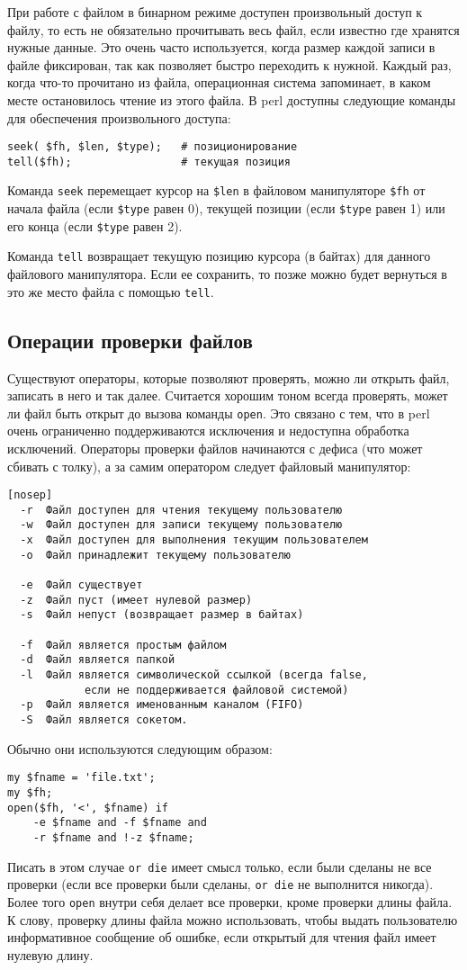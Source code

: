 При работе с файлом в бинарном режиме доступен произвольный доступ к файлу, то есть не обязательно прочитывать весь файл, если известно где хранятся нужные данные. Это очень часто используется, когда размер каждой записи в файле фиксирован, так как позволяет быстро переходить к нужной. Каждый раз, когда что-то прочитано из файла, операционная система запоминает, в каком месте остановилось чтение из этого файла. В perl доступны следующие команды для обеспечения произвольного доступа:
\begin{verbatim}
seek( $fh, $len, $type);   # позиционирование
tell($fh);                 # текущая позиция
\end{verbatim}
Команда \verb|seek| перемещает курсор на \verb|$len| в файловом манипуляторе \verb|$fh| от начала файла (если \verb|$type| равен 0), текущей позиции (если \verb|$type| равен 1) или его конца (если \verb|$type| равен 2).

Команда \verb|tell| возвращает текущую позицию курсора (в байтах) для данного файлового манипулятора. Если ее сохранить, то позже можно будет вернуться в это же место файла с помощью \verb|tell|.

\subsection{Операции проверки файлов}
Существуют операторы, которые позволяют проверять, можно ли открыть файл, записать в него и так далее. Считается хорошим тоном всегда проверять, может ли файл быть открыт до вызова команды \verb|open|. Это связано с тем, что в perl очень ограниченно поддерживаются исключения и недоступна обработка исключений. Операторы проверки файлов начинаются с дефиса (что может сбивать с толку), а за самим оператором следует файловый манипулятор:
\begin{verbatim}[nosep]
  -r  Файл доступен для чтения текущему пользователю
  -w  Файл доступен для записи текущему пользователю
  -x  Файл доступен для выполнения текущим пользователем
  -o  Файл принадлежит текущему пользователю

  -e  Файл существует
  -z  Файл пуст (имеет нулевой размер)
  -s  Файл непуст (возвращает размер в байтах)

  -f  Файл является простым файлом
  -d  Файл является папкой
  -l  Файл является символической ссылкой (всегда false,
            если не поддерживается файловой системой)
  -p  Файл является именованным каналом (FIFO)
  -S  Файл является сокетом.
\end{verbatim}
Обычно они используются следующим образом:
\begin{verbatim}
my $fname = 'file.txt';
my $fh;
open($fh, '<', $fname) if
    -e $fname and -f $fname and
    -r $fname and !-z $fname;
\end{verbatim}
Писать в этом случае \verb|or die| имеет смысл только, если были сделаны не все проверки (если все проверки были сделаны, \verb|or die| не выполнится никогда). Более того \verb|open| внутри себя делает все проверки, кроме проверки длины файла. К слову, проверку длины файла можно использовать, чтобы выдать пользователю информативное сообщение об ошибке, если открытый для чтения файл имеет нулевую длину.

